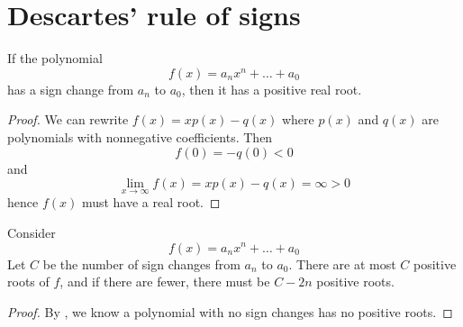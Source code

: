 \documentclass{scrartcl}
\begin{document}
\section{Descartes' rule of signs}
\begin{lemma}
  \label{base-case}
  If the polynomial 
  \[
  f(x)=a_nx^n+\dots+a_0
  \]
  has a sign change from $a_n$ to $a_0$, then it has a positive real root.  
\end{lemma}
\begin{proof}
  We can rewrite $f(x)=x p(x)-q(x)$ where $p(x)$ and $q(x)$ are polynomials with nonnegative coefficients. Then
  \[
  f(0)=-q(0) < 0
  \]
  and 
  \[
  \lim_{x\to \infty} f(x)= xp(x)-q(x)=\infty >0  
  \]
  hence $f(x)$ must have a real root. 
\end{proof}
\begin{theorem}
  Consider
  \[
  f(x)=a_nx^n+\dots+a_0
  \]
  Let $C$ be the number of sign changes from $a_n$ to $a_0$. There are at most $C$ positive roots of $f$, and if there are fewer, there must be $C-2n$ positive roots. 
\end{theorem}
\begin{proof}
  By , we know a polynomial with no sign changes has no positive roots. 
  
\end{proof}
\end{document}

